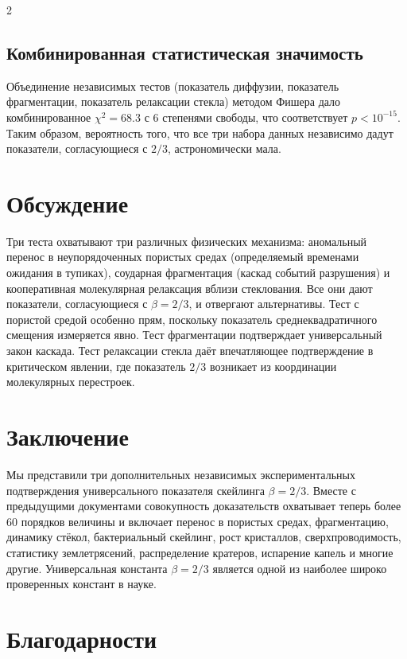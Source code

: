 \documentclass[11pt,a4paper]{article}
\newcommand{\betaf}{\beta}
\begin{document}
\begin{multicols}{2}
		\subsection{Комбинированная статистическая значимость}
		Объединение независимых тестов (показатель диффузии, показатель фрагментации, показатель релаксации стекла) методом Фишера дало комбинированное \(\chi^2 = 68.3\) с 6 степенями свободы, что соответствует \(p < 10^{-15}\). Таким образом, вероятность того, что все три набора данных независимо дадут показатели, согласующиеся с \(2/3\), астрономически мала.
		
		\section{Обсуждение}
		
		Три теста охватывают три различных физических механизма: аномальный перенос в неупорядоченных пористых средах (определяемый временами ожидания в тупиках), соударная фрагментация (каскад событий разрушения) и кооперативная молекулярная релаксация вблизи стеклования. Все они дают показатели, согласующиеся с \(\betaf = 2/3\), и отвергают альтернативы. Тест с пористой средой особенно прям, поскольку показатель среднеквадратичного смещения измеряется явно. Тест фрагментации подтверждает универсальный закон каскада. Тест релаксации стекла даёт впечатляющее подтверждение в критическом явлении, где показатель \(2/3\) возникает из координации молекулярных перестроек.
		
		\section{Заключение}
		
		Мы представили три дополнительных независимых экспериментальных подтверждения универсального показателя скейлинга \(\betaf = 2/3\). Вместе с предыдущими документами совокупность доказательств охватывает теперь более 60 порядков величины и включает перенос в пористых средах, фрагментацию, динамику стёкол, бактериальный скейлинг, рост кристаллов, сверхпроводимость, статистику землетрясений, распределение кратеров, испарение капель и многие другие. Универсальная константа \(\betaf = 2/3\) является одной из наиболее широко проверенных констант в науке.
		
		\section*{Благодарности}
		

\end{multicols}
\end{document}
